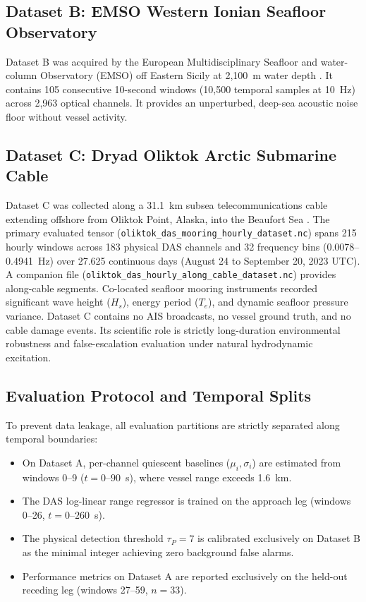 \documentclass[conference]{IEEEtran}
\begin{document}
\subsection{Dataset B: EMSO Western Ionian Seafloor Observatory}
Dataset B was acquired by the European Multidisciplinary Seafloor and
water-column Observatory (EMSO) off Eastern Sicily at 2,100~m water depth
\cite{b11}. It contains 105 consecutive 10-second windows (10,500 temporal
samples at 10~Hz) across 2,963 optical channels. It provides an unperturbed,
deep-sea acoustic noise floor without vessel activity.

\subsection{Dataset C: Dryad Oliktok Arctic Submarine Cable}
Dataset C was collected along a 31.1~km subsea telecommunications cable
extending offshore from Oliktok Point, Alaska, into the Beaufort Sea
\cite{b15}. The primary evaluated tensor
(\texttt{oliktok\_das\_mooring\_hourly\_dataset.nc}) spans 215 hourly windows
across 183 physical DAS channels and 32 frequency bins (0.0078--0.4941~Hz) over
27.625 continuous days (August 24 to September 20, 2023 UTC). A companion
file (\texttt{oliktok\_das\_hourly\_along\_cable\_dataset.nc}) provides along-cable
segments. Co-located seafloor mooring instruments recorded significant wave
height ($H_s$), energy period ($T_e$), and dynamic seafloor pressure variance.
Dataset C contains no AIS broadcasts, no vessel ground truth, and no cable damage
events. Its scientific role is strictly long-duration environmental robustness
and false-escalation evaluation under natural hydrodynamic excitation.

\subsection{Evaluation Protocol and Temporal Splits}
\label{sec:protocol}
To prevent data leakage, all evaluation partitions are strictly separated along temporal boundaries:
\begin{itemize}
\item On Dataset A, per-channel quiescent baselines ($\mu_i, \sigma_i$) are estimated from windows 0--9 ($t=0$--$90$~s), where vessel range exceeds 1.6~km.
\item The DAS log-linear range regressor is trained on the approach leg (windows 0--26, $t=0$--$260$~s).
\item The physical detection threshold $\tau_P = 7$ is calibrated exclusively on Dataset B as the minimal integer achieving zero background false alarms.
\item Performance metrics on Dataset A are reported exclusively on the held-out receding leg (windows 27--59, $n=33$).
\end{itemize}
\end{document}
